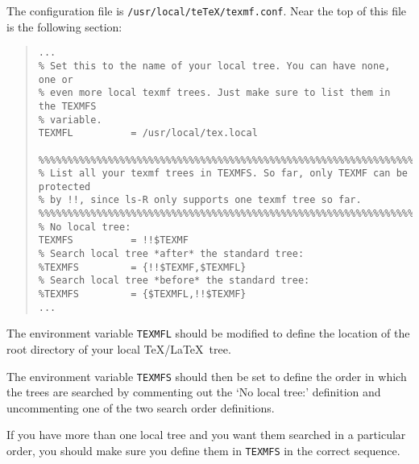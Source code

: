 \documentclass[11pt,twoside]{article}
\begin{document}
The configuration file is \texttt{/usr/local/teTeX/texmf.conf}.  Near the
top of this file is the following section:

\begin{quote}
\begin{small}
\begin{verbatim}
...
% Set this to the name of your local tree. You can have none, one or
% even more local texmf trees. Just make sure to list them in the TEXMFS
% variable.
TEXMFL          = /usr/local/tex.local
 
%%%%%%%%%%%%%%%%%%%%%%%%%%%%%%%%%%%%%%%%%%%%%%%%%%%%%%%%%%%%%%%%%%%%%%%%%%
% List all your texmf trees in TEXMFS. So far, only TEXMF can be protected
% by !!, since ls-R only supports one texmf tree so far.
%%%%%%%%%%%%%%%%%%%%%%%%%%%%%%%%%%%%%%%%%%%%%%%%%%%%%%%%%%%%%%%%%%%%%%%%%%
% No local tree:
TEXMFS          = !!$TEXMF
% Search local tree *after* the standard tree:
%TEXMFS         = {!!$TEXMF,$TEXMFL}
% Search local tree *before* the standard tree:
%TEXMFS         = {$TEXMFL,!!$TEXMF}
... 
\end{verbatim}
\end{small}
\end{quote}

The environment variable \texttt{TEXMFL} should be modified to define the 
location of the root directory of your local \TeX /\LaTeX\ tree.

The environment variable \texttt{TEXMFS} should then be set to define
the order in which the trees are searched by commenting out the `No
local tree:' definition and uncommenting one of the two search order
definitions.

If you have more than one local tree and you want them searched in a
particular order, you should make sure you define them in
\texttt{TEXMFS} in the correct sequence.
\end{document}
